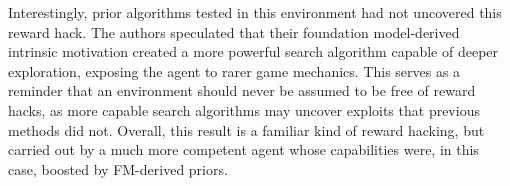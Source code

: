 Interestingly, prior algorithms tested in this environment had not uncovered this reward hack. The authors speculated that their foundation model-derived intrinsic motivation created a more powerful search algorithm capable of deeper exploration, exposing the agent to rarer game mechanics. This serves as a reminder that an environment should never be assumed to be free of reward hacks, as more capable search algorithms may uncover exploits that previous methods did not. Overall, this result is a familiar kind of reward hacking, but carried out by a much more competent agent whose capabilities were, in this case, boosted by FM-derived priors.
